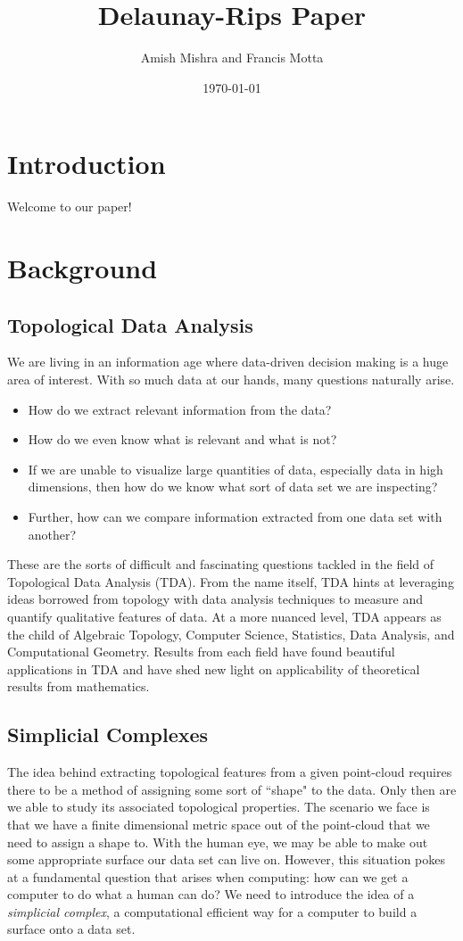 \documentclass[letterpaper,titlepage]{article}
\title{Delaunay-Rips Paper}
\author{Amish Mishra and Francis Motta}
\date{\today}
\begin{document}
\maketitle

\section{Introduction}
Welcome to our paper!

\section{Background}

\subsection{Topological Data Analysis}
    We are living in an information age where data-driven decision making is a huge area of interest. With so much data at our hands, many questions naturally arise.
    \begin{itemize}
        \item How do we extract relevant information from the data? \item How do we even know what is relevant and what is not? 
        \item If we are unable to visualize large quantities of data, especially data in high dimensions, then how do we know what sort of data set we are inspecting? 
        \item Further, how can we compare information extracted from one data set with another?
    \end{itemize}
    These are the sorts of difficult and fascinating questions tackled in the field of Topological Data Analysis (TDA). From the name itself, TDA hints at leveraging ideas borrowed from topology with data analysis techniques to measure and quantify qualitative features of data. At a more nuanced level, TDA appears as the child of Algebraic Topology, Computer Science, Statistics, Data Analysis, and Computational Geometry. Results from each field have found beautiful applications in TDA and have shed new light on applicability of theoretical results from mathematics.
    
    
\subsection{Simplicial Complexes}
    The idea behind extracting topological features from a given point-cloud requires there to be a method of assigning some sort of ``shape" to the data. Only then are we able to study its associated topological properties. The scenario we face is that we have a finite dimensional metric space out of the point-cloud that we need to assign a shape to. With the human eye, we may be able to make out some appropriate surface our data set can live on. However, this situation pokes at a fundamental question that arises when computing: how can we get a computer to do what a human can do? We need to introduce the idea of a \textit{simplicial complex}, a computational efficient way for a computer to build a surface onto a data set.
    
\end{document}
